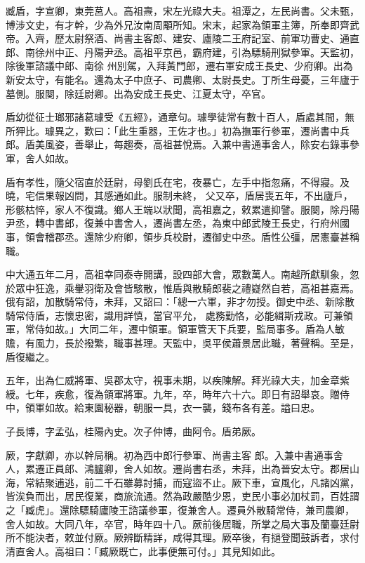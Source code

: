 
\begin{pinyinscope}

 臧盾，字宣卿，東莞莒人。高祖燾，宋左光祿大夫。祖潭之，左民尚書。父未甄，博涉文史，有才幹，少為外兄汝南周顒所知。宋末，起家為領軍主簿，所奉即齊武帝。入齊，歷太尉祭酒、尚書主客郎、建安、廬陵二王府記室、前軍功曹史、通直郎、南徐州中正、丹陽尹丞。高祖平京邑，霸府建，引為驃騎刑獄參軍。天監初，除後軍諮議中郎、南徐
 州別駕，入拜黃門郎，遷右軍安成王長史、少府卿。出為新安太守，有能名。還為太子中庶子、司農卿、太尉長史。丁所生母憂，三年廬于墓側。服闋，除廷尉卿。出為安成王長史、江夏太守，卒官。



 盾幼從征士瑯邪諸葛璩受《五經》，通章句。璩學徒常有數十百人，盾處其間，無所狎比。璩異之，歎曰：「此生重器，王佐才也。」初為撫軍行參軍，遷尚書中兵郎。盾美風姿，善舉止，每趨奏，高祖甚悅焉。入兼中書通事舍人，除安右錄事參軍，舍人如故。



 盾有孝性，隨父宿直於廷尉，母劉氏在宅，夜暴亡，左手中指忽痛，不得寢。及曉，宅信果報凶問，其感通如此。服制未終，
 父又卒，盾居喪五年，不出廬戶，形骸枯悴，家人不復識。鄉人王端以狀聞，高祖嘉之，敕累遣抑譬。服闋，除丹陽尹丞，轉中書郎，復兼中書舍人，遷尚書左丞，為東中郎武陵王長史，行府州國事，領會稽郡丞。還除少府卿，領步兵校尉，遷御史中丞。盾性公彊，居憲臺甚稱職。



 中大通五年二月，高祖幸同泰寺開講，設四部大會，眾數萬人。南越所獻馴象，忽於眾中狂逸，乘轝羽衛及會皆駭散，惟盾與散騎郎裴之禮嶷然自若，高祖甚嘉焉。俄有詔，加散騎常侍，未拜，又詔曰：「總一六軍，非才勿授。御史中丞、新除散騎常侍盾，志懷忠密，識用詳慎，當官平允，
 處務勤恪，必能緝斯戎政。可兼領軍，常侍如故。」大同二年，遷中領軍。領軍管天下兵要，監局事多。盾為人敏贍，有風力，長於撥繁，職事甚理。天監中，吳平侯蕭景居此職，著聲稱。至是，盾復繼之。



 五年，出為仁威將軍、吳郡太守，視事未期，以疾陳解。拜光祿大夫，加金章紫綬。七年，疾愈，復為領軍將軍。九年，卒，時年六十六。即日有詔舉哀。贈侍中，領軍如故。給東園秘器，朝服一具，衣一襲，錢布各有差。謚曰忠。



 子長博，字孟弘，桂陽內史。次子仲博，曲阿令。盾弟厥。



 厥，字獻卿，亦以幹局稱。初為西中郎行參軍、尚書主客
 郎。入兼中書通事舍人，累遷正員郎、鴻臚卿，舍人如故。遷尚書右丞，未拜，出為晉安太守。郡居山海，常結聚逋逃，前二千石雖募討捕，而寇盜不止。厥下車，宣風化，凡諸凶黨，皆涘負而出，居民復業，商旅流通。然為政嚴酷少恩，吏民小事必加杖罰，百姓謂之「臧虎」。還除驃騎廬陵王諮議參軍，復兼舍人。遷員外散騎常侍，兼司農卿，舍人如故。大同八年，卒官，時年四十八。厥前後居職，所掌之局大事及蘭臺廷尉所不能決者，敕並付厥。厥辨斷精詳，咸得其理。厥卒後，有撾登聞鼓訴者，求付清直舍人。高祖曰：「臧厥既亡，此事便無可付。」其見知如此。




\end{pinyinscope}
